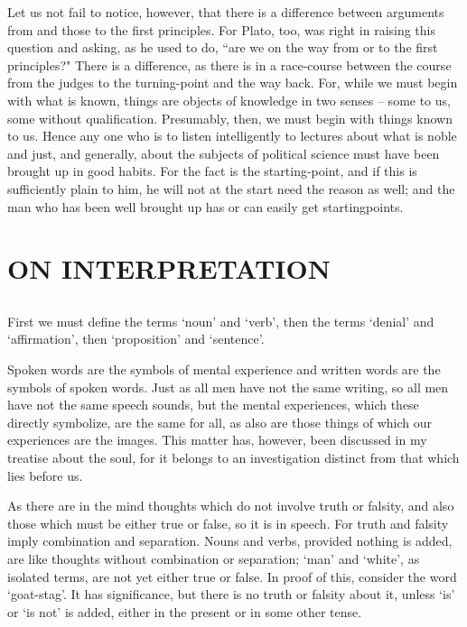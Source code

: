 \documentclass[12pt]{article}
\begin{document}
  Let us not fail to notice, however, that there is a difference
between arguments from and those to the first principles. For Plato,
too, was right in raising this question and asking, as he used to
do, ``are we on the way from or to the first principles?" There is a
difference, as there is in a race-course between the course from the
judges to the turning-point and the way back. For, while we must begin
with what is known, things are objects of knowledge in two senses --
some to us, some without qualification. Presumably, then, we must
begin with things known to us. Hence any one who is to listen
intelligently to lectures about what is noble and just, and generally,
about the subjects of political science must have been brought up in
good habits. For the fact is the starting-point, and if this is
sufficiently plain to him, he will not at the start need the reason as
well; and the man who has been well brought up has or can easily get
startingpoints.


\section{ON INTERPRETATION}

\subsection{}

  First we must define the terms `noun' and `verb', then the terms
`denial' and `affirmation', then `proposition' and `sentence'.

  Spoken words are the symbols of mental experience and written
words are the symbols of spoken words. Just as all men have not the
same writing, so all men have not the same speech sounds, but the
mental experiences, which these directly symbolize, are the same for
all, as also are those things of which our experiences are the images.
This matter has, however, been discussed in my treatise about the
soul, for it belongs to an investigation distinct from that which lies
before us.

  As there are in the mind thoughts which do not involve truth or
falsity, and also those which must be either true or false, so it is
in speech. For truth and falsity imply combination and separation.
Nouns and verbs, provided nothing is added, are like thoughts
without combination or separation; `man' and `white', as isolated
terms, are not yet either true or false. In proof of this, consider
the word `goat-stag'. It has significance, but there is no truth or
falsity about it, unless `is' or `is not' is added, either in the
present or in some other tense.
\end{document}

